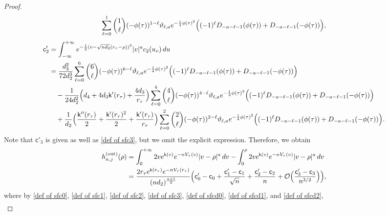 \documentclass[reqno]{amsart}
\newcommand{\1}{\mathds{1}}
\numberwithin{equation}{section}
\theoremstyle{definition}
\begin{document}
\begin{proof}
\begin{align}
\begin{split}
\sum_{\ell=0}^{1}\binom{1}{\ell}(-\phi(\tau))^{1-\ell}
\vartheta_{\ell,a}e^{-\frac{1}{4}\phi(\tau)^2}
\Bigl( 
(-1)^{\ell}D_{-a-\ell-1}(\phi(\tau))
+
D_{-a-\ell-1}(-\phi(\tau))
\Bigr),
\end{split}
\end{align}
\begin{align}
\begin{split}
\label{def of sfcd2}
\mathsf{c}_2'&= \int_{-\infty}^{+\infty}
e^{-\frac{1}{2}(v-\sqrt{nd_2}(r_{\tau}-\rho))^2}
|v|^{a}
c_2(u_v)\,du
\\
&=
\frac{d_3^2}{72d_2^3}
\sum_{\ell=0}^{6}\binom{6}{\ell}(-\phi(\tau))^{6-\ell}
\vartheta_{\ell,a}e^{-\frac{1}{4}\phi(\tau)^2}
\Bigl( 
(-1)^{\ell}D_{-a-\ell-1}(\phi(\tau))
+
D_{-a-\ell-1}(-\phi(\tau))
\Bigr)
\\
&\quad
-
\frac{1}{24d_2^2}\Bigl(d_4+4d_3\mathsf{k}'(r_{\tau})+\frac{4d_3}{r_{\tau}}\Bigr)
\sum_{\ell=0}^{4}\binom{4}{\ell}(-\phi(\tau))^{4-\ell}
\vartheta_{\ell,a}e^{-\frac{1}{4}\phi(\tau)^2}
\Bigl( 
(-1)^{\ell}D_{-a-\ell-1}(\phi(\tau))
+
D_{-a-\ell-1}(-\phi(\tau))
\Bigr)
\\
&\quad
+
\frac{1}{d_2}\Bigl(\frac{\mathsf{k}''(r_{\tau})}{2}+\frac{\mathsf{k}'(r_{\tau})^2}{2}+\frac{\mathsf{k}'(r_{\tau})}{r_{\tau}}\Bigr)
\sum_{\ell=0}^{2}\binom{2}{\ell}(-\phi(\tau))^{2-\ell}
\vartheta_{\ell,a}e^{-\frac{1}{4}\phi(\tau)^2}
\Bigl( 
(-1)^{\ell}D_{-a-\ell-1}(\phi(\tau))
+
D_{-a-\ell-1}(-\phi(\tau))
\Bigr). 
\end{split}
\end{align}
Note that $\mathsf{c}'_3$ is given as well as \eqref{def of sfc3}, but we omit the explicit expression. 
Therefore, we obtain 
\begin{align}
\begin{split}
\label{def of hrho out 2}
h_{n,j}^{(\mathrm{out})}(\rho)
&=
\int_{0}^{+\infty} 2ve^{\mathsf{k}(v)}e^{-nV_{\tau}(v)}|v-\rho|^{a}\,dv
-
\int_0^{\rho}2ve^{\mathsf{k}(v)}e^{-nV_{\tau}(v)}|v-\rho|^{a}\,dv
\\
&=
\frac{2r_{\tau}e^{\mathsf{k}(r_{\tau})}e^{-nV_{\tau}(r_{\tau})}}{(nd_2)^{\frac{a+1}{2}}}
\Bigl( 
\mathsf{c}_0'-\mathsf{c}_0+\frac{\mathsf{c}_1'-\mathsf{c}_1}{\sqrt{n}}+\frac{\mathsf{c}_2'-\mathsf{c}_2}{n}+\mathcal{O}\Bigl(\frac{\mathsf{c}_3'-\mathsf{c}_3}{n^{3/2}}\Bigr)
\Bigr),
\end{split}
\end{align}
where by \eqref{def of sfc0}, \eqref{def of sfc1}, \eqref{def of sfc2}, \eqref{def of sfc3}, \eqref{def of sfcd0}, \eqref{def of sfcd1}, and \eqref{def of sfcd2}, 
\begin{align*}

\end{align*}
\end{proof}
\end{document}
